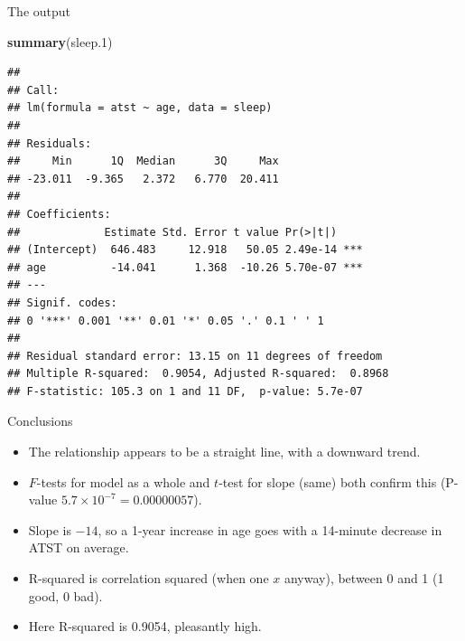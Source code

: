 \documentclass[ignorenonframetext,]{beamer}
\newenvironment{Shaded}{\begin{snugshade}}{\end{snugshade}}
\newcommand{\FloatTok}[1]{\textcolor[rgb]{0.00,0.00,0.81}{#1}}
\newcommand{\KeywordTok}[1]{\textcolor[rgb]{0.13,0.29,0.53}{\textbf{#1}}}
\newcommand{\NormalTok}[1]{#1}
\begin{document}
\begin{frame}[fragile]{The output}
\protect\hypertarget{the-output}{}

\scriptsize

\begin{Shaded}
\begin{Highlighting}[]
\KeywordTok{summary}\NormalTok{(sleep}\FloatTok{.1}\NormalTok{)}
\end{Highlighting}
\end{Shaded}

\begin{verbatim}
## 
## Call:
## lm(formula = atst ~ age, data = sleep)
## 
## Residuals:
##     Min      1Q  Median      3Q     Max 
## -23.011  -9.365   2.372   6.770  20.411 
## 
## Coefficients:
##             Estimate Std. Error t value Pr(>|t|)    
## (Intercept)  646.483     12.918   50.05 2.49e-14 ***
## age          -14.041      1.368  -10.26 5.70e-07 ***
## ---
## Signif. codes:  
## 0 '***' 0.001 '**' 0.01 '*' 0.05 '.' 0.1 ' ' 1
## 
## Residual standard error: 13.15 on 11 degrees of freedom
## Multiple R-squared:  0.9054, Adjusted R-squared:  0.8968 
## F-statistic: 105.3 on 1 and 11 DF,  p-value: 5.7e-07
\end{verbatim}

\normalsize

\end{frame}

\begin{frame}{Conclusions}
\protect\hypertarget{conclusions}{}

\begin{itemize}
\item
  The relationship appears to be a straight line, with a downward trend.
\item
  \(F\)-tests for model as a whole and \(t\)-test for slope (same) both
  confirm this (P-value \(5.7\times 10^{-7}=0.00000057\)).
\item
  Slope is \(-14\), so a 1-year increase in age goes with a 14-minute
  decrease in ATST on average.
\item
  R-squared is correlation squared (when one \(x\) anyway), between 0
  and 1 (1 good, 0 bad).
\item
  Here R-squared is 0.9054, pleasantly high.
\end{itemize}

\end{frame}
\end{document}
